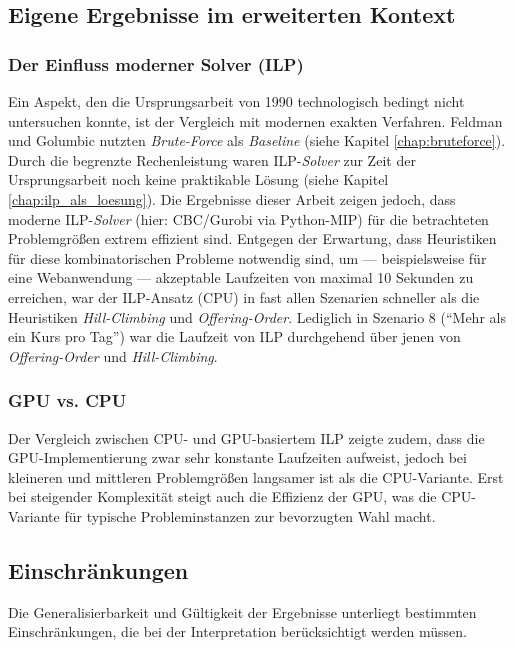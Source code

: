 \subsection{Eigene Ergebnisse im erweiterten Kontext}

\subsubsection{Der Einfluss moderner Solver (ILP)}

Ein Aspekt, den die Ursprungsarbeit von 1990 technologisch bedingt nicht untersuchen konnte, ist der Vergleich mit modernen exakten Verfahren. Feldman und Golumbic nutzten \textit{Brute-Force} als \textit{Baseline} (siehe Kapitel \ref{chap:bruteforce}). Durch die begrenzte Rechenleistung waren ILP-\textit{Solver} zur Zeit der Ursprungsarbeit noch keine praktikable Lösung (siehe Kapitel \ref{chap:ilp_als_loesung}). Die Ergebnisse dieser Arbeit zeigen jedoch, dass moderne ILP-\textit{Solver} (hier: CBC/Gurobi via Python-MIP) für die betrachteten Problemgrößen extrem effizient sind. Entgegen der Erwartung, dass Heuristiken für diese kombinatorischen Probleme notwendig sind, um --- beispielsweise für eine Webanwendung --- akzeptable Laufzeiten von maximal 10 Sekunden \cite{nielsen-2024} zu erreichen, war der ILP-Ansatz (CPU) in fast allen Szenarien schneller als die Heuristiken \textit{Hill-Climbing} und \textit{Offering-Order}. Lediglich in Szenario 8 (\enquote{Mehr als ein Kurs pro Tag}) war die Laufzeit von ILP durchgehend über jenen von \textit{Offering-Order} und \textit{Hill-Climbing}.

\subsubsection{GPU vs. CPU}

Der Vergleich zwischen CPU- und GPU-basiertem ILP zeigte zudem, dass die GPU-Implementierung zwar sehr konstante Laufzeiten aufweist, jedoch bei kleineren und mittleren Problemgrößen langsamer ist als die CPU-Variante. Erst bei steigender Komplexität steigt auch die Effizienz der GPU, was die CPU-Variante für typische Probleminstanzen zur bevorzugten Wahl macht.




\subsection{Einschränkungen}

Die Generalisierbarkeit und Gültigkeit der Ergebnisse unterliegt bestimmten Einschränkungen, die bei der Interpretation berücksichtigt werden müssen.


